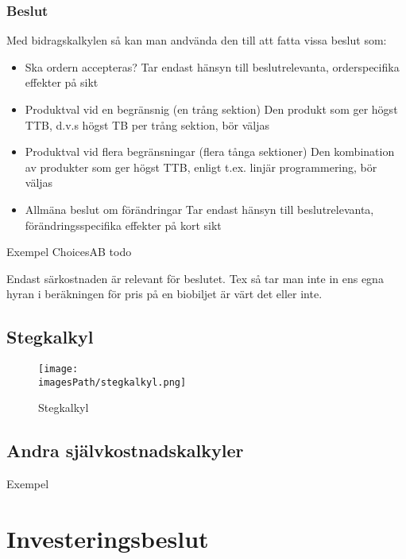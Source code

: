 \documentclass{article}
\newcommand{\imagesPath}{images}
\begin{document}
\subsubsection{Beslut}
Med bidragskalkylen så kan man andvända den till att fatta vissa beslut som:
\begin{itemize}
    \item Ska ordern accepteras? \newline
    Tar endast hänsyn till beslutrelevanta, orderspecifika effekter på sikt
    \item Produktval vid en begränsnig (en trång sektion) \newline
    Den produkt som ger högst TTB, d.v.s högst TB per trång sektion, bör väljas
    \item Produktval vid flera begränsningar (flera tånga sektioner) \newline
    Den kombination av produkter som ger högst TTB, enligt t.ex. linjär programmering, bör väljas
    \item Allmäna beslut om förändringar \newline
    Tar endast hänsyn till beslutrelevanta, förändringsspecifika effekter på kort sikt
\end{itemize}


\begin{exampleblock}{Exempel ChoicesAB}
    todo
    
    Endast särkostnaden är relevant för beslutet. Tex så tar man inte in ens egna hyran i 
    beräkningen för pris på en biobiljet är värt det eller inte.
\end{exampleblock}

\subsection{Stegkalkyl}
\begin{figure}[!h]
    \centering
    \texttt{[image: \\imagesPath/stegkalkyl.png]}
    \caption{Stegkalkyl}
\end{figure}


\subsection{Andra självkostnadskalkyler}
Exempel

\section{Investeringsbeslut}
\end{document}
